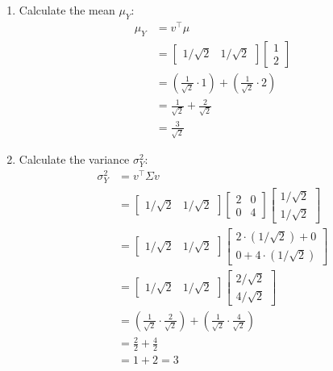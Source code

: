 \documentclass{article}
\begin{document}
\begin{enumerate}
    \item Calculate the mean $\mu_Y$:
    \begin{align*}
    \mu_Y &= v^\top\mu \\
          &= \begin{bmatrix}1/\sqrt{2} & 1/\sqrt{2}\end{bmatrix} \begin{bmatrix}1 \\ 2\end{bmatrix} \\
          &= \left(\frac{1}{\sqrt{2}} \cdot 1\right) + \left(\frac{1}{\sqrt{2}} \cdot 2\right) \\
          &= \frac{1}{\sqrt{2}} + \frac{2}{\sqrt{2}} \\
          &= \frac{3}{\sqrt{2}}
    \end{align*}
    \item Calculate the variance $\sigma_Y^2$:
    \begin{align*}
        \sigma_Y^2 &= v^\top\Sigma v \\
        &= \begin{bmatrix}1/\sqrt{2} & 1/\sqrt{2}\end{bmatrix} \begin{bmatrix}2 & 0 \\ 0 & 4\end{bmatrix} \begin{bmatrix}1/\sqrt{2} \\ 1/\sqrt{2}\end{bmatrix} \\
        &= \begin{bmatrix}1/\sqrt{2} & 1/\sqrt{2}\end{bmatrix} \begin{bmatrix} 2 \cdot (1/\sqrt{2}) + 0 \\ 0 + 4 \cdot (1/\sqrt{2}) \end{bmatrix} \\
        &= \begin{bmatrix}1/\sqrt{2} & 1/\sqrt{2}\end{bmatrix} \begin{bmatrix} 2/\sqrt{2} \\ 4/\sqrt{2} \end{bmatrix} \\
        &= \left(\frac{1}{\sqrt{2}} \cdot \frac{2}{\sqrt{2}}\right) + \left(\frac{1}{\sqrt{2}} \cdot \frac{4}{\sqrt{2}}\right) \\
        &= \frac{2}{2} + \frac{4}{2} \\
        &= 1 + 2 = 3
    \end{align*}
\end{enumerate}
\end{document}
